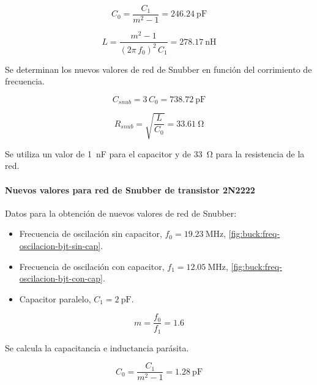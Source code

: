 \begin{equation*}
    C_0 = \frac{C_1}{m^2 - 1} = \SI{246.24}{\pico\farad}
\end{equation*}

\begin{equation*}
    L = \frac{m^2 - 1}{\left(2\pi \, f_0\right)^2 \, C_1} = \SI{278.17}{\nano\henry}
\end{equation*}

Se determinan los nuevos valores de red de Snubber en función del corrimiento de frecuencia.

\begin{equation} \label{eq:buck:cap-snub-mosfet}
    C_{snub} = 3 \, C_0 = \SI{738.72}{\pico\farad}
\end{equation}

\begin{equation} \label{eq:buck:res-snub-mosfet}
    R_{snub} = \sqrt{\frac{L}{C_0}} = \SI{33.61}{\ohm}
\end{equation}

Se utiliza un valor de \SI{1}{\nano\farad} para el capacitor y de \SI{33}{\ohm} para la resistencia de la red.

\paragraph{Nuevos valores para red de Snubber de transistor 2N2222}

Datos para la obtención de nuevos valores de red de Snubber:

\begin{itemize}[noitemsep]
    \item Frecuencia de oscilación sin capacitor, $f_0 = \SI{19.23}{\mega\hertz}$, \cref{fig:buck:freq-oscilacion-bjt-sin-cap}.
    \item Frecuencia de oscilación con capacitor, $f_1 = \SI{12.05}{\mega\hertz}$, \cref{fig:buck:freq-oscilacion-bjt-con-cap}.
    \item Capacitor paralelo, $C_1 = \SI{2}{\pico\farad}$.
\end{itemize} 

\begin{equation*}
    m = \frac{f_0}{f_1} = 1.6
\end{equation*}

Se calcula la capacitancia e inductancia parásita.

\begin{equation*}
    C_0 = \frac{C_1}{m^2 - 1} = \SI{1.28}{\pico\farad}
\end{equation*}


